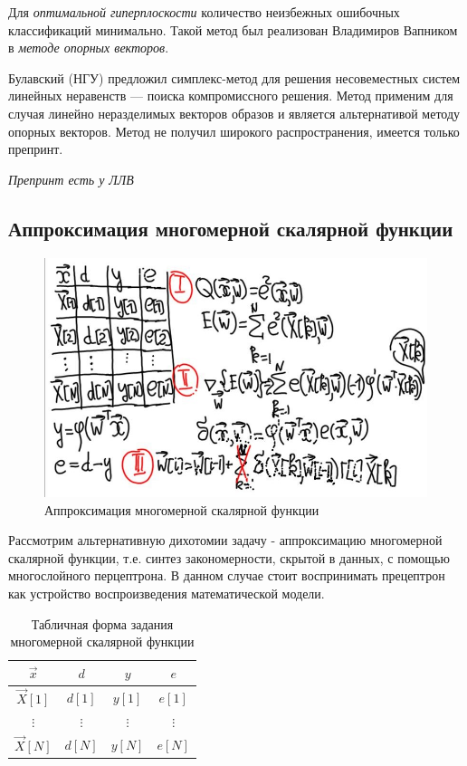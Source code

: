 \documentclass{article}
\begin{document}
Для \textit{оптимальной гиперплоскости} количество неизбежных ошибочных классификаций минимально. 
Такой метод был реализован Владимиров Вапником в \textit{методе опорных векторов}.

Булавский (НГУ) предложил симплекс-метод для решения несовеместных систем линейных неравенств --- 
поиска компромиссного решения. 
Метод применим для случая линейно неразделимых векторов образов и является альтернативой методу 
опорных векторов. 
Метод не получил широкого распространения, имеется только препринт.


\begin{myquote}
    \textit{Препринт есть у ЛЛВ}
\end{myquote}

\subsection{Аппроксимация многомерной скалярной функции}

\begin{figure}[htbp]
    \centering
    \includegraphics[height=7cm]{hyperflat_9_1.jpeg}
    \caption{Аппроксимация многомерной скалярной функции}
    \label{hyperflat_9_1}
\end{figure}

Рассмотрим альтернативную дихотомии задачу - аппроксимацию многомерной скалярной функции,  т.е.
синтез закономерности, скрытой в данных, с помощью многослойного перцептрона.
В данном случае стоит воспринимать прецептрон как устройство воспроизведения математической модели.

\begin{table}[H]
    \centering
    \begin{tabular}{| c | c | c | c |}
        \hline
        $\vec{x}$ & $d$ & $y$ & $e$ \\
        \hline
        $\vec{X}[1]$ & $d[1]$ & $y[1]$ & $e[1]$ \\
        \hline
        $\vdots$ & $\vdots$ & $\vdots$ & $\vdots$ \\
        \hline
        $\vec{X}[N]$ & $d[N]$ & $y[N]$ & $e[N]$ \\
        \hline
    \end{tabular}
    \label{table:scalar-func-table}
    \caption{Табличная форма задания многомерной скалярной функции}
\end{table}
\end{document}
